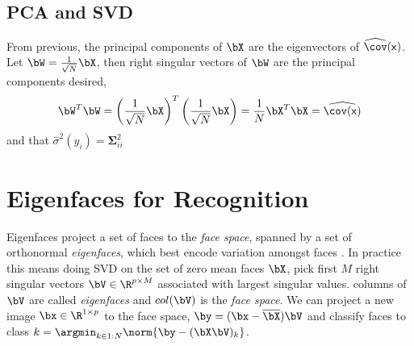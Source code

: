 \documentclass[11pt]{article}
\newcommand\rx{\ensuremath{\mathsf{x}}}
\begin{document}
\subsection{PCA and SVD}

From previous, the principal components of $\bX$ are the eigenvectors of $\widehat{\cov}(\rx)$. Let $\bW = \frac{1}{\sqrt{N}} \bX$, then right singular vectors of $\bW$ are the principal components desired,
\[
    \bW^T\bW 
    = \left( \frac{1}{\sqrt{N}} \bX \right)^T \left( \frac{1}{\sqrt{N}} \bX \right)
    = \frac{1}{N} \bX^T\bX
    = \widehat{\cov(\rx)}
\]
and that $\hat{\sigma}^2(y_i) = \boldsymbol{\Sigma}_{ii}^2$

\section{Eigenfaces for Recognition}

Eigenfaces project a set of faces to the \textit{face space}, spanned by a set of orthonormal \textit{eigenfaces}, which best encode variation amongst faces \cite{pentlandFaceRecognitionUsing1991,turkEigenfacesRecognition1991,junzhangFaceRecognitionEigenface1997}. In practice this means doing SVD on the set of zero mean faces $\bX$, pick first $M$ right singular vectors $\bV\in\R^{p\times M}$ associated with largest singular values. columns of $\bV$ are called \textit{eigenfaces} and $col(\bV)$ is the \textit{face space}. We can project a new image $\bx \in \R^{1\times p}$ to the face space, $\by = (\bx-\overline{\bX})\bV$ and classify faces to class $k = \argmin_{k\in 1:N} \norm{ \by - (\bX\bV)_k }$.





\printbibliography 
\end{document}
